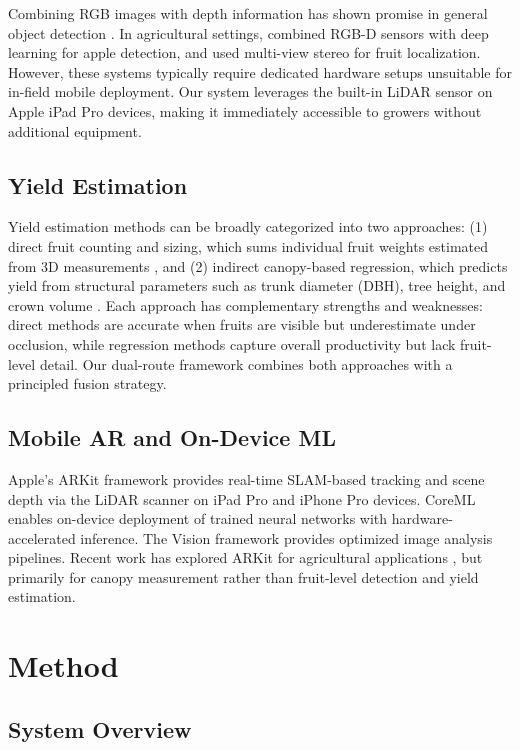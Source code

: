 \documentclass[article,final]{iclr2024_conference}
\begin{document}
Combining RGB images with depth information has shown promise in general object detection \citep{gupta2019rgb}. In agricultural settings, \citet{wang2022apple} combined RGB-D sensors with deep learning for apple detection, and \citet{fu2020fruit} used multi-view stereo for fruit localization. However, these systems typically require dedicated hardware setups unsuitable for in-field mobile deployment. Our system leverages the built-in LiDAR sensor on Apple iPad Pro devices, making it immediately accessible to growers without additional equipment.

\subsection{Yield Estimation}

Yield estimation methods can be broadly categorized into two approaches: (1) direct fruit counting and sizing, which sums individual fruit weights estimated from 3D measurements \citep{stein2016pheno}, and (2) indirect canopy-based regression, which predicts yield from structural parameters such as trunk diameter (DBH), tree height, and crown volume \citep{legg2013apple}. Each approach has complementary strengths and weaknesses: direct methods are accurate when fruits are visible but underestimate under occlusion, while regression methods capture overall productivity but lack fruit-level detail. Our dual-route framework combines both approaches with a principled fusion strategy.

\subsection{Mobile AR and On-Device ML}

Apple's ARKit framework provides real-time SLAM-based tracking and scene depth via the LiDAR scanner on iPad Pro and iPhone Pro devices. CoreML enables on-device deployment of trained neural networks with hardware-accelerated inference. The Vision framework provides optimized image analysis pipelines. Recent work has explored ARKit for agricultural applications \citep{buddenbaum2022apple}, but primarily for canopy measurement rather than fruit-level detection and yield estimation.

\section{Method}
\label{sec:method}

\subsection{System Overview}
\end{document}
